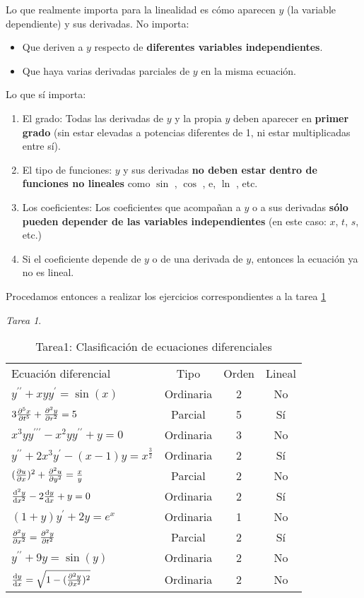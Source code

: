 \documentclass[12pt]{article} %
\theoremstyle{remark} %
\newtheorem{tarea}{Tarea}[section] %
\newcounter{ejercicio}[tarea]
\begin{document}
Lo que realmente importa para la linealidad es cómo aparecen $y$ (la variable dependiente) y sus derivadas.
No importa: 
\begin{itemize}
  \item Que deriven a $y$ respecto de \textbf{diferentes variables independientes}.
  \item Que haya varias derivadas parciales de $y$ en la misma ecuación.
\end{itemize}
Lo que sí importa:
\begin{enumerate}
\item El grado: Todas las derivadas de $y$ y la propia $y$ deben aparecer en \textbf{primer grado} (sin estar elevadas a potencias diferentes de 1, ni estar multiplicadas entre sí).
\item El tipo de funciones: $y$ y sus derivadas \textbf{no deben estar dentro de funciones no lineales} como $\sin$ , $\cos$ , e, $\ln$ , etc.
\item Los coeficientes: Los coeficientes que acompañan a $y$ o a sus derivadas \textbf{sólo pueden depender de las variables independientes} (en este caso: $x$, $t$, $s$, etc.)
\item Si el coeficiente depende de $y$ o de una derivada de $y$, entonces la ecuación ya no es lineal.
\end{enumerate}

Procedamos entonces a realizar los ejercicios correspondientes a la tarea \cref{tarea:clasificacion}

\begin{tarea} \label{tarea:clasificacion}
\begin{table}[H]
  \centering
  \caption{Tarea1: Clasificación de ecuaciones diferenciales}
  \label{tab:EjercicioClasificacion}
  \begin{tabular}{lccc}
    Ecuación diferencial & Tipo & Orden & Lineal \\[0.5em]
    $y^{\prime \prime} + xyy^{\prime} = \sin (x)$ & Ordinaria & 2 & No \\[0.6em]
    $3 \pdv[5]{x}{t} + \pdv[2]{y}{r} = 5$ & Parcial & 5 & Sí \\[0.6em]
    $x^3yy^{\prime \prime \prime} - x^2yy^{\prime \prime} + y = 0$ & Ordinaria & 3 & No \\[0.6em]
    $y^{\prime \prime} + 2x^3y^{\prime} - (x-1)y = x^{\frac{3}{2}}$ & Ordinaria & 2 & Sí \\[0.6em]
    $(\pdv{u}{x})^2 + \pdv[2]{u}{y} = \frac{x}{y}$ &Parcial & 2 & No \\[0.6em]
    $\dv[2]{y}{x} - 2 \dv{y}{x} + y = 0$ & Ordinaria & 2 & Sí \\[0.6em]
    $(1+y)y^{\prime} + 2y = e^x$ & Ordinaria & 1 & No \\[0.6em]
    $\pdv[2]{y}{x} = \pdv[2]{y}{t}$ & Parcial & 2 & Sí \\[0.6em]
    $y^{\prime \prime} + 9y = \sin (y)$ & Ordinaria & 2 & No \\[0.6em]
    $\dv{y}{x} = \sqrt{1 - (\pdv[2]{y}{x})^2}$ & Ordinaria & 2 & No
  \end{tabular}
\end{table}
\end{tarea}
\end{document}
